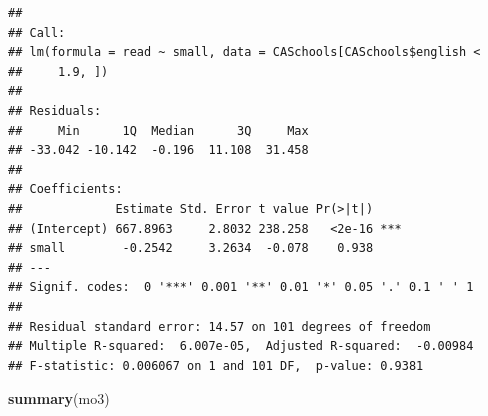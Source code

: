 \documentclass[
]{book}
\newenvironment{Shaded}{\begin{snugshade}}{\end{snugshade}}
\newcommand{\DataTypeTok}[1]{\textcolor[rgb]{0.13,0.29,0.53}{#1}}
\newcommand{\DecValTok}[1]{\textcolor[rgb]{0.00,0.00,0.81}{#1}}
\newcommand{\FloatTok}[1]{\textcolor[rgb]{0.00,0.00,0.81}{#1}}
\newcommand{\KeywordTok}[1]{\textcolor[rgb]{0.13,0.29,0.53}{\textbf{#1}}}
\newcommand{\NormalTok}[1]{#1}
\newcommand{\OperatorTok}[1]{\textcolor[rgb]{0.81,0.36,0.00}{\textbf{#1}}}
\newcommand{\StringTok}[1]{\textcolor[rgb]{0.31,0.60,0.02}{#1}}
\begin{document}
\begin{Shaded}
\end{Shaded}

\begin{verbatim}
## 
## Call:
## lm(formula = read ~ small, data = CASchools[CASchools$english < 
##     1.9, ])
## 
## Residuals:
##     Min      1Q  Median      3Q     Max 
## -33.042 -10.142  -0.196  11.108  31.458 
## 
## Coefficients:
##             Estimate Std. Error t value Pr(>|t|)    
## (Intercept) 667.8963     2.8032 238.258   <2e-16 ***
## small        -0.2542     3.2634  -0.078    0.938    
## ---
## Signif. codes:  0 '***' 0.001 '**' 0.01 '*' 0.05 '.' 0.1 ' ' 1
## 
## Residual standard error: 14.57 on 101 degrees of freedom
## Multiple R-squared:  6.007e-05,  Adjusted R-squared:  -0.00984 
## F-statistic: 0.006067 on 1 and 101 DF,  p-value: 0.9381
\end{verbatim}

\begin{Shaded}
\begin{Highlighting}[]
\KeywordTok{summary}\NormalTok{(mo3)}
\end{Highlighting}
\end{Shaded}
\end{document}
